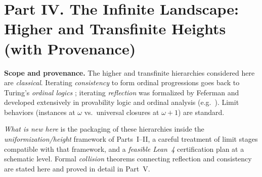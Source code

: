 \documentclass[11pt]{article}
\theoremstyle{definition}
\theoremstyle{remark}
\newcommand{\WLPO}{\mathrm{WLPO}}
\begin{document}





\part*{Part IV. The Infinite Landscape: Higher and Transfinite Heights (with Provenance)}

\providecommand{\EA}{\mathrm{EA}}
\providecommand{\ISigmaOne}{\mathrm{I}\Sigma_1}
\providecommand{\RFNSigOne}{\mathrm{RFN}_{\Sigma^0_1}}
\providecommand{\LArithSym}{\mathcal{L}_{\mathrm{Arith}}^{\pm}}
\providecommand{\LArith}{\mathcal{L}_{\mathrm{Arith}}}
\providecommand{\LCons}{\mathcal{L}_{\mathrm{Cons}}}
\providecommand{\Con}{\mathrm{Con}}
\providecommand{\HA}{\mathrm{HA}}
\providecommand{\PA}{\mathrm{PA}}
\providecommand{\LPO}{\mathrm{LPO}}
\providecommand{\WLPO}{\mathrm{WLPO}}

\begin{mdframed}[style=status]
\textbf{Scope and provenance.}
The higher and transfinite hierarchies considered here are \emph{classical}.
Iterating \emph{consistency} to form ordinal progressions goes back to
Turing's \emph{ordinal logics} \cite{Turing1939}; iterating \emph{reflection}
was formalized by Feferman \cite{Feferman1962} and developed extensively in
provability logic and ordinal analysis (e.g.\ \cite{HajekPudlak,Beklemishev2003,Beklemishev2004}).
Limit behaviors (instances at $\omega$ vs.\ universal closures at $\omega{+}1$) are standard.
%
\smallskip

\emph{What is new here} is the packaging of these hierarchies inside the
\emph{uniformization/height} framework of Parts~I--II, a careful treatment of
limit stages compatible with that framework, and a \emph{feasible Lean~4}
certification plan at a schematic level. Formal \emph{collision} theorems
connecting reflection and consistency are stated here and proved in detail in Part~V.
\end{mdframed}

\end{document}
